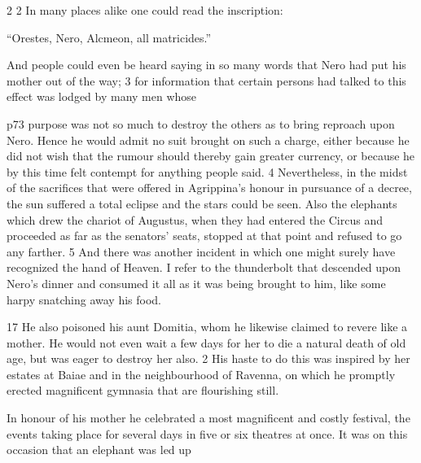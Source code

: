 2 2 In many places alike one could read the inscription:

``Orestes, Nero, Alcmeon, all matricides.''

And people could even be heard saying in so many words that Nero had put his mother out of the way; 3 for information that certain persons had talked to this effect was lodged by many men whose

p73 purpose was not so much to destroy the others as to bring reproach upon Nero. Hence he would admit no suit brought on such a charge, either because he did not wish that the rumour should thereby gain greater currency, or because he by this time felt contempt for anything people said. 4 Nevertheless, in the midst of the sacrifices that were offered in Agrippina's honour in pursuance of a decree, the sun suffered a total eclipse and the stars could be seen. Also the elephants which drew the chariot of Augustus, when they had entered the Circus and proceeded as far as the senators' seats, stopped at that point and refused to go any farther. 5 And there was another incident in which one might surely have recognized the hand of Heaven. I refer to the thunderbolt that descended upon Nero's dinner and consumed it all as it was being brought to him, like some harpy snatching away his food.

17
He also poisoned his aunt Domitia, whom he likewise claimed to revere like a mother. He would not even wait a few days for her to die a natural death of old age, but was eager to destroy her also. 2 His haste to do this was inspired by her estates at Baiae and in the neighbourhood of Ravenna, on which he promptly erected magnificent gymnasia that are flourishing still.

In honour of his mother he celebrated a most magnificent and costly festival, the events taking place for several days in five or six theatres at once. It was on this occasion that an elephant was led up


